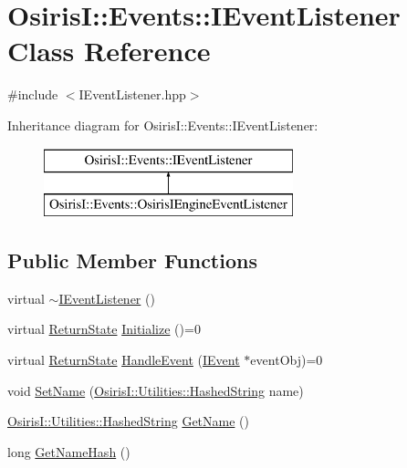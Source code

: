 \hypertarget{class_osiris_i_1_1_events_1_1_i_event_listener}{\section{Osiris\-I\-:\-:Events\-:\-:I\-Event\-Listener Class Reference}
\label{class_osiris_i_1_1_events_1_1_i_event_listener}
}


{\ttfamily \#include $<$I\-Event\-Listener.\-hpp$>$}

Inheritance diagram for Osiris\-I\-:\-:Events\-:\-:I\-Event\-Listener\-:\begin{figure}[H]
\begin{center}
\leavevmode
\includegraphics[height=2.000000cm]{class_osiris_i_1_1_events_1_1_i_event_listener}
\end{center}
\end{figure}
\subsection*{Public Member Functions}
\begin{DoxyCompactItemize}
\item 
virtual \hyperlink{class_osiris_i_1_1_events_1_1_i_event_listener_affd69a105cf988d2dc172ee13e930fc7}{$\sim$\-I\-Event\-Listener} ()
\item 
virtual \hyperlink{namespace_osiris_i_a8f53bf938dc75c65c6a529694514013e}{Return\-State} \hyperlink{class_osiris_i_1_1_events_1_1_i_event_listener_a230481634f96c92c7010fabf917d566c}{Initialize} ()=0
\item 
virtual \hyperlink{namespace_osiris_i_a8f53bf938dc75c65c6a529694514013e}{Return\-State} \hyperlink{class_osiris_i_1_1_events_1_1_i_event_listener_a8dcff88a9edc4eb35244782cc39ee840}{Handle\-Event} (\hyperlink{struct_osiris_i_1_1_events_1_1_i_event}{I\-Event} $\ast$event\-Obj)=0
\item 
void \hyperlink{class_osiris_i_1_1_events_1_1_i_event_listener_a8383eb60b5e49477b82f0fff5f0eb4f6}{Set\-Name} (\hyperlink{class_osiris_i_1_1_utilities_1_1_hashed_string}{Osiris\-I\-::\-Utilities\-::\-Hashed\-String} name)
\item 
\hyperlink{class_osiris_i_1_1_utilities_1_1_hashed_string}{Osiris\-I\-::\-Utilities\-::\-Hashed\-String} \hyperlink{class_osiris_i_1_1_events_1_1_i_event_listener_a33fe949ee5935e6ac0a3c1ae5b75c226}{Get\-Name} ()
\item 
long \hyperlink{class_osiris_i_1_1_events_1_1_i_event_listener_a6039481f2bfa78a22b8a0db9bf6f2d54}{Get\-Name\-Hash} ()
\end{DoxyCompactItemize}

